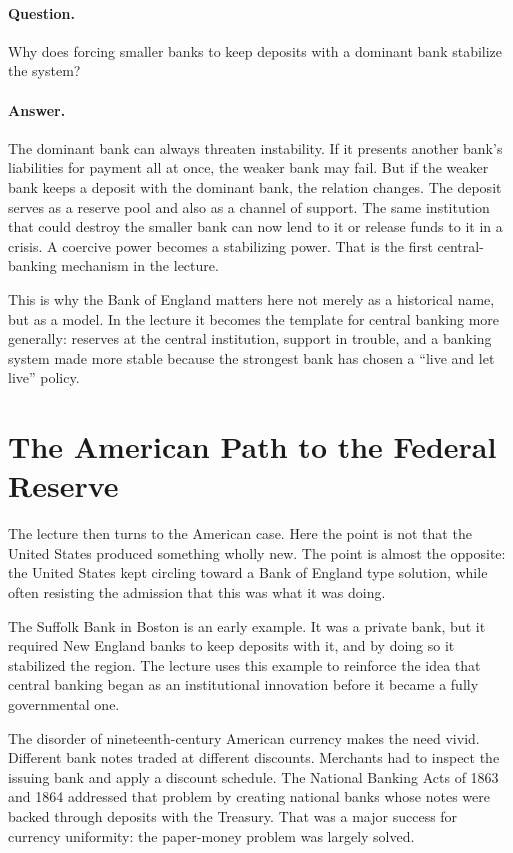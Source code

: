 \paragraph{Question.} Why does forcing smaller banks to keep deposits with a dominant bank stabilize the system?

\paragraph{Answer.} The dominant bank can always threaten instability. If it presents another bank's liabilities for payment all at once, the weaker bank may fail. But if the weaker bank keeps a deposit with the dominant bank, the relation changes. The deposit serves as a reserve pool and also as a channel of support. The same institution that could destroy the smaller bank can now lend to it or release funds to it in a crisis. A coercive power becomes a stabilizing power. That is the first central-banking mechanism in the lecture.

This is why the Bank of England matters here not merely as a historical name, but as a model. In the lecture it becomes the template for central banking more generally: reserves at the central institution, support in trouble, and a banking system made more stable because the strongest bank has chosen a ``live and let live'' policy.

\section{The American Path to the Federal Reserve}

The lecture then turns to the American case. Here the point is not that the United States produced something wholly new. The point is almost the opposite: the United States kept circling toward a Bank of England type solution, while often resisting the admission that this was what it was doing.

The Suffolk Bank in Boston is an early example. It was a private bank, but it required New England banks to keep deposits with it, and by doing so it stabilized the region. The lecture uses this example to reinforce the idea that central banking began as an institutional innovation before it became a fully governmental one.

The disorder of nineteenth-century American currency makes the need vivid. Different bank notes traded at different discounts. Merchants had to inspect the issuing bank and apply a discount schedule. The National Banking Acts of 1863 and 1864 addressed that problem by creating national banks whose notes were backed through deposits with the Treasury. That was a major success for currency uniformity: the paper-money problem was largely solved.

